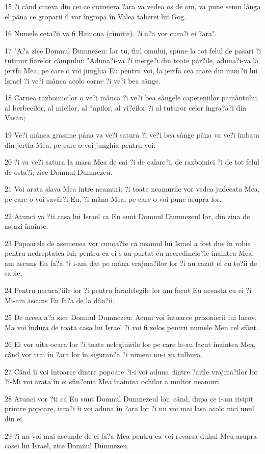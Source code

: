 \par 15 ?i când cineva din cei ce cutreiera ?ara va vedea os de om, va pune semn lânga el pâna ce groparii îl vor îngropa în Valea taberei lui Gog.
\par 16 Numele ceta?ii va fi Hamona (cimitir). ?i a?a vor cura?i ei ?ara".
\par 17 "A?a zice Domnul Dumnezeu: Iar tu, fiul omului, spune la tot felul de pasari ?i tuturor fiarelor câmpului: "Aduna?i-va ?i merge?i din toate par?ile, aduna?i-va la jertfa Mea, pe care o voi junghia Eu pentru voi, la jertfa cea mare din mun?ii lui Israel ?i ve?i mânca acolo carne ?i ve?i bea sânge.
\par 18 Carnea razboinicilor o ve?i mânca ?i ve?i bea sângele capeteniilor pamântului, al berbecilor, al mieilor, al ?apilor, al vi?eilor ?i al tuturor celor îngra?a?i din Vasan;
\par 19 Ve?i mânca grasime pâna va ve?i satura ?i ve?i bea sânge pâna va ve?i îmbata din jertfa Mea, pe care o voi junghia pentru voi.
\par 20 ?i va ve?i satura la masa Mea de cai ?i de calare?i, de razboinici ?i de tot felul de osta?i, zice Domnul Dumnezeu.
\par 21 Voi arata slava Mea între neamuri, ?i toate neamurile vor vedea judecata Mea, pe care o voi savâr?i Eu, ?i mâna Mea, pe care o voi pune asupra lor.
\par 22 Atunci va ?ti casa lui Israel ca Eu sunt Domnul Dumnezeul lor, din ziua de astazi înainte.
\par 23 Popoarele de asemenea vor cunoa?te ca neamul lui Israel a fost dus în robie pentru nedreptatea lui; pentru ca ei s-au purtat cu necredincio?ie înaintea Mea, am ascuns Eu fa?a ?i i-am dat pe mâna vrajma?ilor lor ?i au cazut ei cu to?ii de sabie;
\par 24 Pentru necura?iile lor ?i pentru faradelegile lor am facut Eu aceasta cu ei ?i Mi-am ascuns Eu fa?a de la dân?ii.
\par 25 De aceea a?a zice Domnul Dumnezeu: Acum voi întoarce prizonierii lui Iacov, Ma voi îndura de toata casa lui Israel ?i voi fi zelos pentru numele Meu cel sfânt.
\par 26 Ei vor uita ocara lor ?i toate nelegiuirile lor pe care le-au facut înaintea Mea, când vor trai în ?ara lor în siguran?a ?i nimeni nu-i va tulbura.
\par 27 Când îi voi întoarce dintre popoare ?i-i voi aduna dintre ?arile vrajma?ilor lor ?i-Mi voi arata în ei sfin?enia Mea înaintea ochilor a multor neamuri.
\par 28 Atunci vor ?ti ca Eu sunt Domnul Dumnezeul lor, când, dupa ce i-am risipit printre popoare, iara?i îi voi aduna în ?ara lor ?i nu voi mai lasa acolo nici unul din ei.
\par 29 ?i nu voi mai ascunde de ei fa?a Mea pentru ca voi revarsa duhul Meu asupra casei lui Israel, zice Domnul Dumnezeu.

